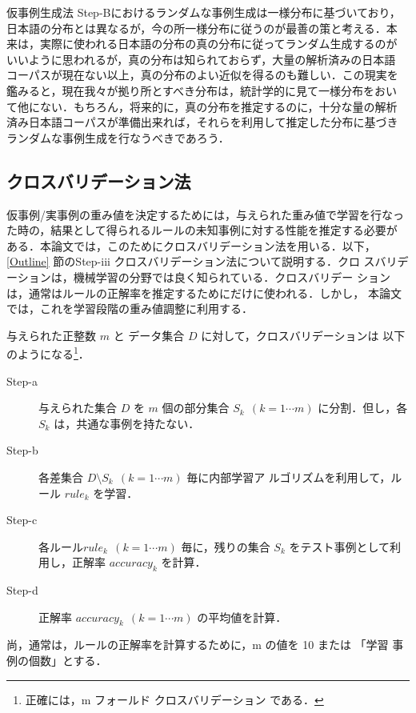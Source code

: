 \bigskip
仮事例生成法 Step-Bにおけるランダムな事例生成は一様分布に基づいており，
日本語の分布とは異なるが，今の所一様分布に従うのが最善の策と考える．本
来は，実際に使われる日本語の分布の真の分布に従ってランダム生成するのが
いいように思われるが，真の分布は知られておらず，大量の解析済みの日本語
コーパスが現在ない以上，真の分布のよい近似を得るのも難しい．この現実を
鑑みると，現在我々が拠り所とすべき分布は，統計学的に見て一様分布をおい
て他にない．もちろん，将来的に，真の分布を推定するのに，十分な量の解析
済み日本語コーパスが準備出来れば，それらを利用して推定した分布に基づき
ランダムな事例生成を行なうべきであろう．

\subsection{クロスバリデーション法\label{CrossValidation}}
仮事例/実事例の重み値を決定するためには，与えられた重み値で学習を行なっ
た時の，結果として得られるルールの未知事例に対する性能を推定する必要が
ある．本論文では，このためにクロスバリデーション法を用いる．以下，
\ref{Outline} 節のStep-iii クロスバリデーション法について説明する．クロ
スバリデーションは，機械学習の分野では良く知られている．クロスバリデー
ションは，通常はルールの正解率を推定するためにだけに使われる．しかし，
本論文では，これを学習段階の重み値調整に利用する．

与えられた正整数 $m$ と データ集合 $D$ に対して，クロスバリデーションは
以下のようになる\footnote{正確には，m フォールド クロスバリデーション
である．}．

\begin{description}
\item[Step-a] 与えられた集合 $D$ を $m$ 個の部分集合 $S_k ~~(k = 1
\cdots m)$ に分割．但し，各 $S_k$ は，共通な事例を持たない．

\item[Step-b] 各差集合 $D \setminus S_k ~~(k = 1 \cdots m) $ 毎に内部学習ア
ルゴリズムを利用して，ルール $rule_k$ を学習．

\item[Step-c] 各ルール$rule_k ~~(k = 1 \cdots m)$ 毎に，残りの集合 $S_k$ 
をテスト事例として利用し，正解率 $accuracy_k$ を計算．

\item[Step-d] 正解率 $accuracy_k ~~(k = 1 \cdots m)$ の平均値を計算．
\end{description}

\bigskip
尚，通常は，ルールの正解率を計算するために，m の値を 10 または 「学習
事例の個数」とする．

